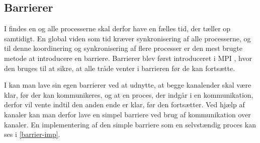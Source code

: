 \subsection{Barrierer} \label{sec:barrierer}

I \des findes en  og alle processerne skal derfor have en fælles tid, der tæller op 
samtidigt.  En global viden som tid kræver synkronisering af alle 
processerne, og til denne koordinering og synkronisering af flere 
processer er  den mest brugte metode at introducere en barriere. Barrierer blev først introduceret i MPI \cite{mpi-barrier}, hvor den bruges til at 
sikre, at alle tråde venter i barrieren før de kan fortsætte. 

I \csp kan man lave sin egen barrierer ved at udnytte, at begge 
kanalender skal være klar, før der kan kommunikeres, og at en proces, der 
indgår i en kommunikation, derfor vil vente indtil den anden ende er klar, før den 
fortsætter.  Ved hjælp af kanaler kan man derfor lave en simpel barriere 
 ved brug af kommunikation over kanaler.  En implementering af den simple 
barriere som en selvstændig proces kan ses i \cref{barrier-imp}.

